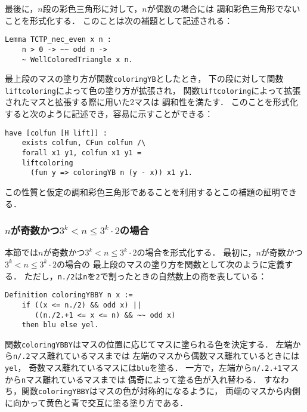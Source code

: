 最後に，$n$段の彩色三角形に対して，$n$が偶数の場合には
調和彩色三角形でないことを形式化する．
このことは次の補題として記述される：
\begin{lstlisting}[language=Coq]
  Lemma TCTP_nec_even x n :
    n > 0 -> ~~ odd n ->
    ~ WellColoredTriangle x n.
\end{lstlisting}
最上段のマスの塗り方が関数{\tt{coloringYB}}としたとき，
下の段に対して関数{\tt{liftcoloring}}によって色の塗り方が拡張され，
関数{\tt{liftcoloring}}によって拡張されたマスと拡張する際に用いた2マスは
調和性を満たす．
このことを形式化すると次のように記述でき，容易に示すことができる：
\begin{lstlisting}[language=Coq]
  have [colfun [H lift]] :
    exists colfun, CFun colfun /\
    forall x1 y1, colfun x1 y1 =
    liftcoloring
      (fun y => coloringYB n (y - x)) x1 y1.
\end{lstlisting}
この性質と仮定の調和彩色三角形であることを利用するとこの補題の証明できる．



\subsubsection{$n$が奇数かつ$3^{k} < n \leq 3^{k} \cdot 2$の場合}
本節では$n$が奇数かつ$3^{k} < n \leq 3^{k} \cdot 2$の場合を形式化する．
最初に，$n$が奇数かつ$3^{k} < n \leq 3^{k} \cdot 2$の場合の
最上段のマスの塗り方を関数として次のように定義する．
ただし，{\tt{n./2}}は{\tt{n}}を{\tt{2}}で割ったときの自然数上の商を表している：
\begin{lstlisting}[language=Coq]
  Definition coloringYBBY n x :=
    if ((x <= n./2) && odd x) ||
       ((n./2.+1 <= x <= n) && ~~ odd x)
    then blu else yel.
\end{lstlisting}
関数{\tt{coloringYBBY}}はマスの位置に応じてマスに塗られる色を決定する．
左端から{\tt{n/.2}}マス離れているマスまでは
左端のマスから偶数マス離れているときには{\tt{yel}}，
奇数マス離れているマスには{\tt{blu}}を塗る．
一方で，左端から{\tt{n/.2.+1}}マスから{\tt{n}}マス離れているマスまでは
偶奇によって塗る色が入れ替わる．
すなわち，関数{\tt{coloringYBBY}}はマスの色が対称的になるように，
両端のマスから内側に向かって黄色と青で交互に塗る塗り方である．

